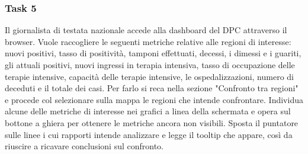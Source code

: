 
\subsubsection{Task 5}
\label{sss:cw-task-5}

Il giornalista di testata nazionale accede alla dashboard del DPC attraverso il browser.
Vuole raccogliere le seguenti metriche relative alle regioni di interesse: nuovi positivi, tasso di positività, tamponi effettuati, decessi, i dimessi e i guariti, gli attuali positivi, nuovi ingressi in terapia intensiva, tasso di occupazione delle terapie intensive, capacità delle terapie intensive, le ospedalizzazioni,  numero di deceduti e il totale dei casi.
Per farlo si reca nella sezione "Confronto tra regioni" e procede col selezionare sulla mappa le regioni che intende confrontare.
Individua alcune delle metriche di interesse nei grafici a linea della schermata e opera sul bottone a ghiera per ottenere le metriche ancora non visibili.
Sposta il puntatore sulle linee i cui rapporti intende analizzare e legge il tooltip che appare, così da riuscire a ricavare conclusioni sul confronto.
